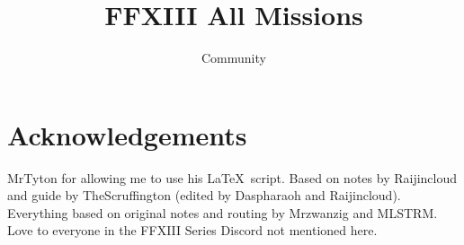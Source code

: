 \documentclass[dvipsnames]{report}
\title{FFXIII All Missions}
\author{Community\texttrademark}
\begin{document}
\singlespacing
\maketitle
\tableofcontents

\section*{Acknowledgements}
MrTyton for allowing me to use his \LaTeX~script.
Based on notes by Raijincloud and guide by TheScruffington (edited by Daspharaoh and Raijincloud).
Everything based on original notes and routing by Mrzwanzig and MLSTRM.
Love to everyone in the FFXIII Series Discord not mentioned here.
\newpage

\begin{multicols}{2}












































\end{multicols}
\end{document}
